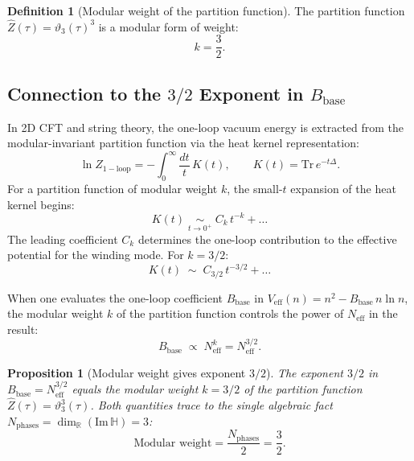 \documentclass[12pt,a4paper]{article}
\newtheorem{proposition}[theorem]{Proposition}
\theoremstyle{definition}
\newtheorem{definition}[theorem]{Definition}
\theoremstyle{remark}
\begin{document}
\begin{definition}[Modular weight of the partition function]
\label{def:exp32:weight}
The partition function $\hat{Z}(\tau) = \vartheta_3(\tau)^3$ is a modular form
of weight:
\begin{equation}
  k = \frac{3}{2}.
  \label{eq:exp32:weight}
\end{equation}
\end{definition}

\subsection{Connection to the $3/2$ Exponent in $B_{\mathrm{base}}$}
\label{ssec:exp32:mod:connection}

In 2D CFT and string theory, the one-loop vacuum energy is extracted from the
modular-invariant partition function via the heat kernel representation:
\begin{equation}
  \ln Z_{\mathrm{1-loop}} = -\int_0^\infty \frac{dt}{t}\, K(t),
  \qquad
  K(t) = \mathrm{Tr}\, e^{-t\Delta}.
  \label{eq:exp32:1loop}
\end{equation}
For a partition function of modular weight $k$, the small-$t$ expansion of the
heat kernel begins:
\begin{equation}
  K(t) \;\underset{t\to 0^+}{\sim}\; C_k\, t^{-k} + \ldots
  \label{eq:exp32:heat_expansion}
\end{equation}
The leading coefficient $C_k$ determines the one-loop contribution to the
effective potential for the winding mode.  For $k = 3/2$:
\begin{equation}
  K(t) \;\sim\; C_{3/2}\, t^{-3/2} + \ldots
  \label{eq:exp32:heat_32}
\end{equation}

When one evaluates the one-loop coefficient $B_{\mathrm{base}}$ in
$V_{\mathrm{eff}}(n) = n^2 - B_{\mathrm{base}}\, n\ln n$, the modular weight $k$
of the partition function controls the power of $N_{\mathrm{eff}}$ in the result:
\begin{equation}
  B_{\mathrm{base}} \;\propto\; N_{\mathrm{eff}}^k = N_{\mathrm{eff}}^{3/2}.
  \label{eq:exp32:Bbase_mod}
\end{equation}

\begin{proposition}[Modular weight gives exponent $3/2$]
\label{prop:exp32:mod_exponent}
The exponent $3/2$ in $B_{\mathrm{base}} = N_{\mathrm{eff}}^{3/2}$ equals the
modular weight $k = 3/2$ of the partition function $\hat{Z}(\tau) = \vartheta_3^3(\tau)$.
Both quantities trace to the single algebraic fact
$N_{\mathrm{phases}} = \dim_\mathbb{R}(\mathrm{Im}\,\mathbb{H}) = 3$:
\begin{equation}
  \text{Modular weight} = \frac{N_{\mathrm{phases}}}{2} = \frac{3}{2}.
  \label{eq:exp32:weight_from_phases}
\end{equation}
\end{proposition}
\end{document}
